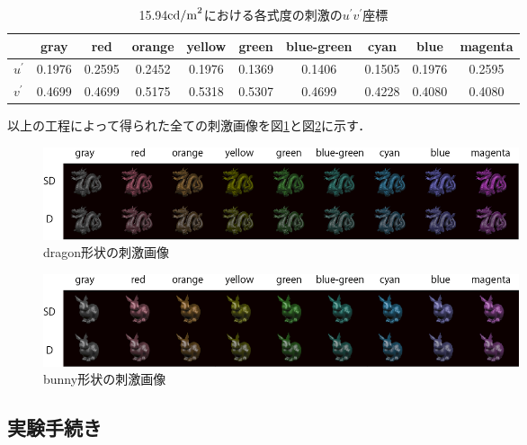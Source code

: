                \begin{table}[h]
                    \centering
                    \caption{15.94${\rm cd/m}^2$における各式度の刺激の$u^{\prime}v^{\prime}$座標}
                    \begin{tabular}{|l||c|c|c|c|c|c|c|c|c|} \hline
                                      & gray   & red    & orange & yellow & green  & blue-green & cyan   & blue   & magenta \\ \hline \hline
                        $u^{\prime}$  & 0.1976 & 0.2595 & 0.2452 & 0.1976 & 0.1369 & 0.1406     & 0.1505 & 0.1976 & 0.2595  \\ \hline
                        $v^{\prime}$  & 0.4699 & 0.4699 & 0.5175 & 0.5318 & 0.5307 & 0.4699     & 0.4228 & 0.4080 & 0.4080  \\ \hline
                    \end{tabular}
                    \label{uvyTable}
                \end{table}

                
            以上の工程によって得られた全ての刺激画像を図\ref{ex1_stimuli_d}と図\ref{ex1_stimuli_b}に示す．

            \begin{figure}[h]
                \centering
                \includegraphics[width=14.0cm]{./img/ex1_stimuli_d_p.png}
                \caption{dragon形状の刺激画像}
                \label{ex1_stimuli_d}
            \end{figure}

            \begin{figure}[h]
                \centering
                \includegraphics[width=14.0cm]{./img/ex1_stimuli_b_p.png}
                \caption{bunny形状の刺激画像}
                \label{ex1_stimuli_b}
            \end{figure}

        \subsection{実験手続き}

